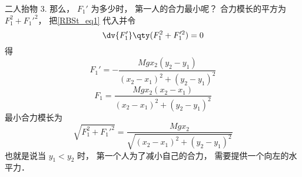 \begin{example}{二人抬物}
3. 那么， $F_1'$ 为多少时， 第一人的合力最小呢？ 合力模长的平方为 $F_1^2 + F_1'^2$， 把\autoref{RBSt_eq1} 代入并令
\begin{equation}
\dv{F_1'}\qty(F_1^2 + F_1'^2) = 0
\end{equation}
得
\begin{equation}
F_1' = -\frac{Mgx_2 (y_2 - y_1)}{(x_2-x_1)^2 + (y_2 -y_1)^2}
\end{equation}
\begin{equation}
F_1 = \frac{Mg x_2(x_2-x_1)}{(x_2-x_1)^2 + (y_2 -y_1)^2}
\end{equation}
最小合力模长为
\begin{equation}
\sqrt{F_1^2 + F_1'^2} = \frac{Mg x_2}{\sqrt{(x_2 - x_1)^2 + (y_2-y_1)^2}}
\end{equation}
也就是说当 $y_1 < y_2$ 时， 第一个人为了减小自己的合力， 需要提供一个向左的水平力．
\end{example}


